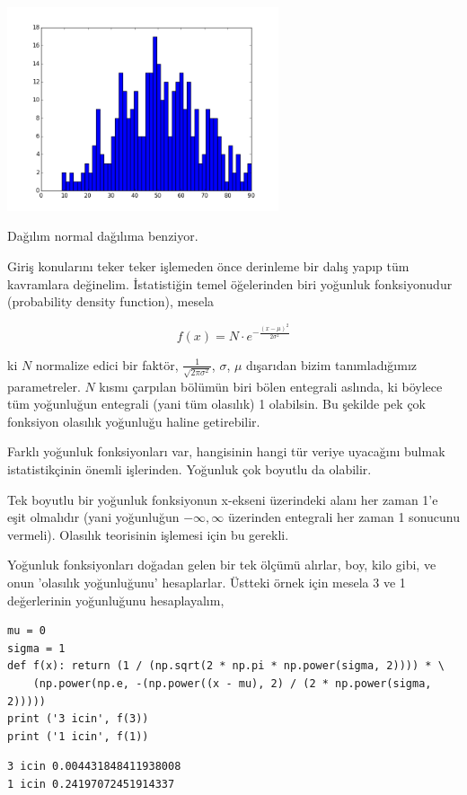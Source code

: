 \documentclass[12pt,fleqn]{article}\usepackage{../../common}
\begin{document}
\includegraphics[height=6cm]{stat_intro_09.png}

Dağılım normal dağılıma benziyor.

Giriş konularını teker teker işlemeden önce derinleme bir dalış yapıp tüm
kavramlara değinelim. İstatistiğin temel öğelerinden biri yoğunluk fonksiyonudur
(probability density function), mesela

$$
f(x)=N \cdot e^{-\frac{(x-\mu)^2}{2\sigma^2}}
$$

ki $N$ normalize edici bir faktör, $\frac{1}{\sqrt{2\pi\sigma^2}}$, $\sigma$,
$\mu$ dışarıdan bizim tanımladığımız parametreler. $N$ kısmı çarpılan bölümün
biri bölen entegrali aslında, ki böylece tüm yoğunluğun entegrali (yani tüm
olasılık) 1 olabilsin. Bu şekilde pek çok fonksiyon olasılık yoğunluğu haline
getirebilir.

Farklı yoğunluk fonksiyonları var, hangisinin hangi tür veriye uyacağını bulmak
istatistikçinin önemli işlerinden. Yoğunluk çok boyutlu da olabilir.

Tek boyutlu bir yoğunluk fonksiyonun x-ekseni üzerindeki alanı her zaman 1'e
eşit olmalıdır (yani yoğunluğun $-\infty,\infty$ üzerinden entegrali her zaman 1
sonucunu vermeli). Olasılık teorisinin işlemesi için bu gerekli.

Yoğunluk fonksiyonları doğadan gelen bir tek ölçümü alırlar, boy, kilo gibi, ve
onun 'olasılık yoğunluğunu' hesaplarlar. Üstteki örnek için mesela 3 ve 1
değerlerinin yoğunluğunu hesaplayalım,

\begin{verbatim}
mu = 0
sigma = 1  
def f(x): return (1 / (np.sqrt(2 * np.pi * np.power(sigma, 2)))) * \
    (np.power(np.e, -(np.power((x - mu), 2) / (2 * np.power(sigma, 2)))))
print ('3 icin', f(3))
print ('1 icin', f(1))
\end{verbatim}

\begin{verbatim}
3 icin 0.004431848411938008
1 icin 0.24197072451914337
\end{verbatim}
\end{document}
